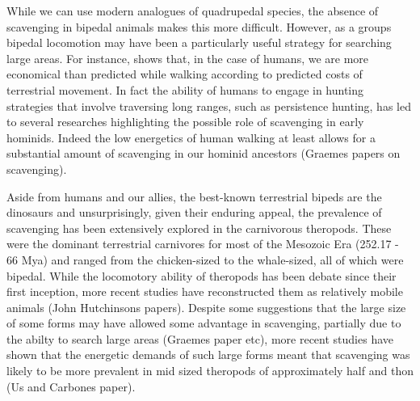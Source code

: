 \documentclass[a4paper,12pt]{article}
\begin{document}
While we can use modern analogues of quadrupedal species, the absence of scavenging in bipedal animals makes this more difficult. However, as a groups bipedal locomotion may have been a particularly useful strategy for  searching large areas. For instance, \cite{alexander2004bipedal} shows that, in the case of humans, we are more economical than predicted while walking according to predicted costs of terrestrial movement. In fact the ability of humans to engage in hunting strategies that involve traversing long ranges, such as persistence hunting, has led to several researches highlighting the possible role of scavenging in early hominids. Indeed the low energetics of human walking at least allows for a substantial amount of scavenging in our hominid ancestors (Graemes papers on scavenging).

Aside from humans and our allies, the best-known terrestrial bipeds are the dinosaurs and unsurprisingly, given their enduring appeal, the prevalence of scavenging has been extensively explored in the carnivorous theropods.
These were the dominant terrestrial carnivores for most of the Mesozoic Era (252.17 - 66 Mya) and ranged from the chicken-sized to the whale-sized, all of which were bipedal.
While the locomotory ability of theropods has been debate since their first inception, more recent studies have reconstructed them as relatively mobile animals (John Hutchinsons papers). 
Despite some suggestions that the large size of some forms may have allowed some advantage in scavenging, partially due to the abilty to search large areas (Graemes paper etc), more recent studies have shown that the energetic demands of such large forms meant that scavenging was likely to be more prevalent in mid sized theropods of approximately half and thon (Us and Carbones paper).
\end{document}
